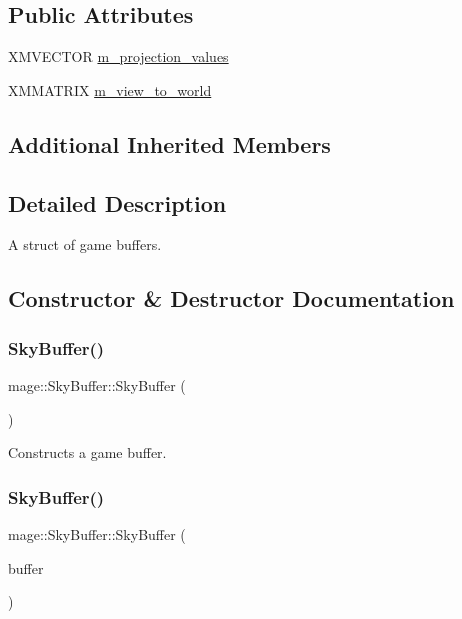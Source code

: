 \subsection*{Public Attributes}
\begin{DoxyCompactItemize}
\item 
X\+M\+V\+E\+C\+T\+OR \hyperlink{structmage_1_1_sky_buffer_a1f5e0bc2381d392771994d0c2fce9ee4}{m\+\_\+projection\+\_\+values}
\item 
X\+M\+M\+A\+T\+R\+IX \hyperlink{structmage_1_1_sky_buffer_ab2c20eb6422420a3e79ff1ef90efd735}{m\+\_\+view\+\_\+to\+\_\+world}
\end{DoxyCompactItemize}
\subsection*{Additional Inherited Members}


\subsection{Detailed Description}
A struct of game buffers. 

\subsection{Constructor \& Destructor Documentation}
\hypertarget{structmage_1_1_sky_buffer_ab78f7f7ade478aeef620088009e6942d}{}\label{structmage_1_1_sky_buffer_ab78f7f7ade478aeef620088009e6942d} 
\subsubsection{\texorpdfstring{Sky\+Buffer()}{SkyBuffer()}\hspace{0.1cm}{\footnotesize\ttfamily [1/3]}}
{\footnotesize\ttfamily mage\+::\+Sky\+Buffer\+::\+Sky\+Buffer (\begin{DoxyParamCaption}{ }\end{DoxyParamCaption})}

Constructs a game buffer. \hypertarget{structmage_1_1_sky_buffer_a025aa6d0e74bbcc765fdb778d69ae68b}{}\label{structmage_1_1_sky_buffer_a025aa6d0e74bbcc765fdb778d69ae68b} 
\subsubsection{\texorpdfstring{Sky\+Buffer()}{SkyBuffer()}\hspace{0.1cm}{\footnotesize\ttfamily [2/3]}}
{\footnotesize\ttfamily mage\+::\+Sky\+Buffer\+::\+Sky\+Buffer (\begin{DoxyParamCaption}\item[{const \hyperlink{structmage_1_1_sky_buffer}{Sky\+Buffer} \&}]{buffer }\end{DoxyParamCaption})\hspace{0.3cm}{\ttfamily [default]}}

